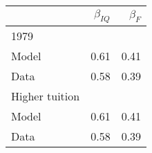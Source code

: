 \begin{tabular}{lrr}
\hline
  & $\beta_{IQ}$  & $\beta_{F}$  \\ 
\hline
1979 &   &   \\ 
Model & 0.61  & 0.41  \\ 
Data & 0.58  & 0.39  \\ 
Higher tuition &   &   \\ 
Model & 0.61  & 0.41  \\ 
Data & 0.58  & 0.39  \\ 
\hline
\end{tabular}%
